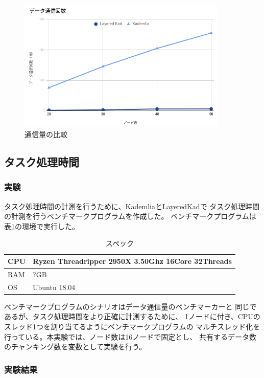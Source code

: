 \documentclass[sotsuron]{jcsie}
\begin{document}
\begin{figure}[H]
	\centering
	\includegraphics[width=10cm]{./assets/image/traffic_graph.png}
	\caption{通信量の比較}
	\label{fig:traffic-graph}
\end{figure}

\subsection{タスク処理時間}
\subsubsection{実験}
タスク処理時間の計測を行うために、KademliaとLayeredKadで
タスク処理時間の計測を行うベンチマークプログラムを作成した。
ベンチマークプログラムは表\ref{table:spec-ryzen}の環境で実行した。

\begin{table}[H]
	\caption{スペック}	
	\centering
	\label{table:spec-ryzen}
	\begin{tabular}{|l|l|}
		\hline
		CPU &   
		Ryzen Threadripper 2950X 3.50Ghz 16Core 32Threads \\ \hline	
		RAM &   
		?GB \\ \hline	
		OS  &   
		Ubuntu 18.04 \\ \hline
	\end{tabular}	
\end{table}

ベンチマークプログラムのシナリオはデータ通信量のベンチマーカーと
同じであるが、タスク処理時間をより正確に計測するために、
1ノードに付き、CPUのスレッド1つを割り当てるようにベンチマークプログラムの
マルチスレッド化を行っている。本実験では、ノード数は16ノードで固定とし、
共有するデータ数のチャンキング数を変数として実験を行う。

\subsubsection{実験結果}
\end{document}
